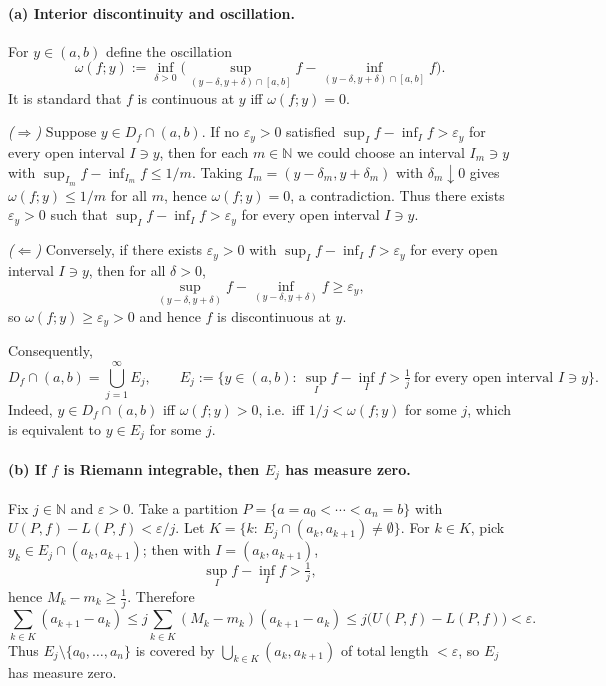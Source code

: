 \documentclass[12pt,a4paper]{article}
\theoremstyle{plain}
\theoremstyle{definition}
\theoremstyle{remark}
\theoremstyle{remark}
\begin{document}
\paragraph{(a) Interior discontinuity and oscillation.} \mbox{}\par
For $y\in(a,b)$ define the oscillation
\[
\omega(f;y):=\inf_{\delta>0}\Big(\sup_{(y-\delta,y+\delta)\cap[a,b]} f
-\inf_{(y-\delta,y+\delta)\cap[a,b]} f\Big).
\]
It is standard that $f$ is continuous at $y$ iff $\omega(f;y)=0$.

\emph{($\Rightarrow$)} Suppose $y\in D_f\cap(a,b)$. If no $\varepsilon_y>0$ satisfied
$\sup_I f-\inf_I f>\varepsilon_y$ for every open interval $I\ni y$, then for each $m\in\mathbb N$
we could choose an interval $I_m\ni y$ with $\sup_{I_m} f-\inf_{I_m} f\le 1/m$. Taking $I_m=(y-\delta_m,y+\delta_m)$ with $\delta_m\downarrow 0$ gives $\omega(f;y)\le 1/m$ for all $m$, hence $\omega(f;y)=0$, a contradiction. Thus there exists $\varepsilon_y>0$ such that
$\sup_I f-\inf_I f>\varepsilon_y$ for every open interval $I\ni y$.

\emph{($\Leftarrow$)} Conversely, if there exists $\varepsilon_y>0$ with
$\sup_I f-\inf_I f>\varepsilon_y$ for every open interval $I\ni y$, then for all $\delta>0$,
\[
\sup_{(y-\delta,y+\delta)} f-\inf_{(y-\delta,y+\delta)} f\ge \varepsilon_y,
\]
so $\omega(f;y)\ge \varepsilon_y>0$ and hence $f$ is discontinuous at $y$.

Consequently,
\[
D_f\cap(a,b)=\bigcup_{j=1}^\infty E_j,
\qquad
E_j:=\Big\{y\in(a,b):\ \sup_I f-\inf_I f>\tfrac1j \ \text{for every open interval } I\ni y\Big\}.
\]
Indeed, $y\in D_f\cap(a,b)$ iff $\omega(f;y)>0$, i.e.\ iff $1/j<\omega(f;y)$ for some $j$,
which is equivalent to $y\in E_j$ for some $j$.

\paragraph{(b) If $f$ is Riemann integrable, then $E_j$ has measure zero.} \mbox{}\par
Fix $j\in\mathbb N$ and $\varepsilon>0$. Take a partition
$P=\{a=a_0<\cdots<a_n=b\}$ with $U(P,f)-L(P,f)<\varepsilon/j$.
Let $K=\{k:\ E_j\cap(a_k,a_{k+1})\neq\emptyset\}$.
For $k\in K$, pick $y_k\in E_j\cap(a_k,a_{k+1})$; then with $I=(a_k,a_{k+1})$,
\[
\sup_I f-\inf_I f>\tfrac1j,
\]
hence $M_k-m_k\ge\tfrac1j$. Therefore
\[
\sum_{k\in K}(a_{k+1}-a_k)
\le j\sum_{k\in K}(M_k-m_k)(a_{k+1}-a_k)
\le j\big(U(P,f)-L(P,f)\big)<\varepsilon.
\]
Thus $E_j\setminus\{a_0,\dots,a_n\}$ is covered by $\bigcup_{k\in K}(a_k,a_{k+1})$ of
total length $<\varepsilon$, so $E_j$ has measure zero.
\end{document}

